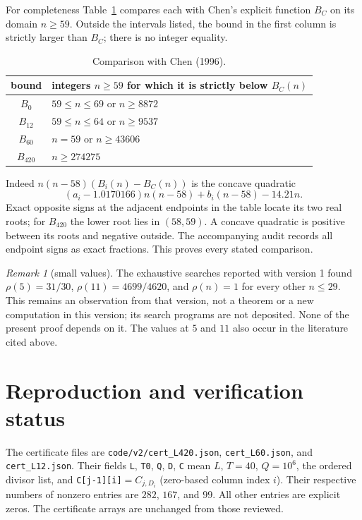 \documentclass[10pt]{article}
\theoremstyle{remark}
\newtheorem{remark}[theorem]{Remark}
\begin{document}
For completeness Table~\ref{tab:chen} compares each with Chen's
explicit function $B_C$ on its domain $n\ge59$. Outside the intervals
listed, the bound in the first column is strictly larger than $B_C$;
there is no integer equality.
\begin{table}[ht]
\centering
\begin{tabular}{c|l}
bound & integers $n\ge59$ for which it is strictly below $B_C(n)$\\\hline
$B_0$ & $59\le n\le69$ or $n\ge8872$\\
$B_{12}$ & $59\le n\le64$ or $n\ge9537$\\
$B_{60}$ & $n=59$ or $n\ge43606$\\
$B_{420}$ & $n\ge274275$
\end{tabular}
\caption{Comparison with Chen (1996).}\label{tab:chen}
\end{table}
Indeed $n(n-58)(B_i(n)-B_C(n))$ is the concave quadratic
\[
 (a_i-1.0170166)n(n-58)+b_i(n-58)-14.21n.
\]
Exact opposite signs at the adjacent endpoints in the table locate
its two real roots; for $B_{420}$ the lower root lies in $(58,59)$.
A concave quadratic is positive between its roots and negative
outside. The accompanying audit records all endpoint signs as exact
fractions. This proves every stated comparison.

\begin{remark}[small values]
The exhaustive searches reported with version 1 found $\rho(5)=31/30$,
$\rho(11)=4699/4620$, and $\rho(n)=1$ for every other $n\le29$.
This remains an observation from that version, not a theorem or a new
computation in this version; its search programs are not deposited.
None of the present proof depends on it. The values at $5$ and $11$
also occur in the literature cited above.
\end{remark}

\section{Reproduction and verification status}\label{sec:repro}
The certificate files are \texttt{code/v2/cert\_L420.json},
\texttt{cert\_L60.json}, and \texttt{cert\_L12.json}. Their fields
\texttt{L}, \texttt{T0}, \texttt{Q}, \texttt{D}, \texttt{C} mean
$L$, $T=40$, $Q=10^6$, the ordered divisor list, and
\texttt{C[j-1][i]}$=C_{j,D_i}$ (zero-based column index $i$).
Their respective numbers of nonzero entries are $282$, $167$, and $99$.
All other entries are explicit zeros. The certificate arrays are
unchanged from those reviewed.
\end{document}
